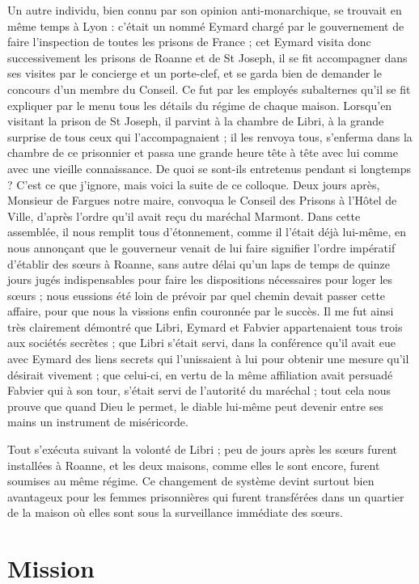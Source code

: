 \documentclass[11pt,a4paper]{report}
\begin{document}
Un autre individu, bien connu par son opinion anti-monarchique, se trouvait en même temps à Lyon : c'était un nommé Eymard chargé par le gouvernement de faire l'inspection de toutes les prisons de France ; cet Eymard visita donc successivement les prisons de Roanne et de St Joseph, il se fit accompagner dans ses visites par le concierge et un porte-clef, et se garda bien de demander le concours d'un membre du Conseil. Ce fut par les employés subalternes qu'il se fit expliquer par le menu tous les détails du régime de chaque maison. Lorsqu'en visitant la prison de St Joseph, il parvint à la chambre de Libri, à la grande surprise de tous ceux qui l'accompagnaient ; il les renvoya tous, s'enferma dans la chambre de ce prisonnier et passa une grande heure tête à tête avec lui comme avec une vieille connaissance. De quoi se sont-ils entretenus pendant si longtemps ? C'est ce que j'ignore, mais voici la suite de ce colloque. Deux jours après, Monsieur de Fargues notre maire, convoqua le Conseil des Prisons à l'Hôtel de Ville, d'après l'ordre qu'il avait reçu du maréchal Marmont. Dans cette assemblée, il nous remplit tous d'étonnement, comme il l'était déjà lui-même, en nous annonçant que le gouverneur venait de lui faire signifier l'ordre impératif d'établir des sœurs à Roanne, sans autre délai qu'un laps de temps de quinze jours jugés indispensables pour faire les dispositions nécessaires pour loger les sœurs ; nous eussions été loin de prévoir par quel chemin devait passer cette affaire, pour que nous la vissions enfin couronnée par le succès. Il me fut ainsi très clairement démontré que Libri, Eymard et Fabvier appartenaient tous trois aux sociétés secrètes ; que Libri s'était servi, dans la conférence qu'il avait eue avec Eymard des liens secrets qui l'unissaient à lui pour obtenir une mesure qu'il désirait vivement ; que celui-ci, en vertu de la même affiliation avait persuadé Fabvier qui à son tour, s'était servi de l'autorité du maréchal ; tout cela nous prouve que quand Dieu le permet, le diable lui-même peut devenir entre ses mains un instrument de miséricorde.

Tout s'exécuta suivant la volonté de Libri ; peu de jours après les sœurs furent installées à Roanne, et les deux maisons, comme elles le sont encore, furent soumises au même régime. Ce changement de système devint surtout bien avantageux pour les femmes prisonnières qui furent transférées dans un quartier de la maison où elles sont sous la surveillance immédiate des sœurs.

\section*{Mission}
\end{document}
